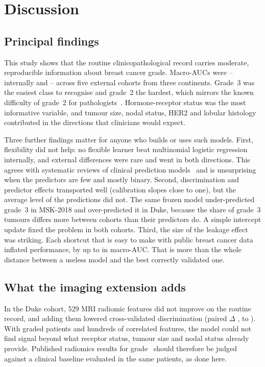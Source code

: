 \section{Discussion}\label{sec:discussion}

\subsection{Principal findings}
This study shows that the routine clinicopathological record carries moderate, reproducible
information about breast cancer grade. Macro-AUCs were \IntAucMinR--\IntAucMaxR{} internally and
\ExtAucMin--\ExtAucMax{} across five external cohorts from three continents. Grade~3 was the easiest
class to recognise and grade~2 the hardest, which mirrors the known difficulty of grade~2 for
pathologists~\citep{boiesen2000grading,vandooijeweert2020variation}. Hormone-receptor status was the
most informative variable, and tumour size, nodal status, HER2 and lobular histology contributed in
the directions that clinicians would expect.

Three further findings matter for anyone who builds or uses such models. First, flexibility did not
help: no flexible learner beat multinomial logistic regression internally, and external differences
were rare and went in both directions. This agrees with systematic reviews of clinical prediction
models~\citep{christodoulou2019lr} and is unsurprising when the predictors are few and mostly binary.
Second, discrimination and predictor effects transported well (calibration slopes close to one), but
the average level of the predictions did not. The same frozen model under-predicted grade~3 in
MSK-2018 and over-predicted it in Duke, because the share of grade~3 tumours differs more between
cohorts than their predictors do. A simple intercept update fixed the problem in both cohorts.
Third, the size of the leakage effect was striking. Each shortcut that is easy to make with public
breast cancer data inflated performance, by up to \LeakMaxInfl{} in macro-AUC. That is more than the
whole distance between a useless model and the best correctly validated one.

\subsection{What the imaging extension adds}
In the Duke cohort, 529 MRI radiomic features did not improve on the routine record, and adding them
lowered cross-validated discrimination (paired $\Delta$ \DukeFusDelta, \DukeFusDeltaLo{} to
\DukeFusDeltaHi). With \NDukeRad{} graded patients and hundreds of correlated features, the model
could not find signal beyond what receptor status, tumour size and nodal status already provide.
Published radiomics results for grade~\citep{wang2022duke,wang2026dcemrigrade} should therefore be
judged against a clinical baseline evaluated in the same patients, as done here.

